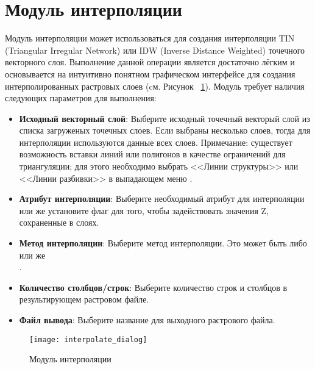 
\section{Модуль интерполяции}


Модуль интерполяции может использоваться для создания интерполяции TIN
(Triangular Irregular Network) или IDW (Inverse Distance Weighted)
точечного векторного слоя. Выполнение данной операции является
достаточно лёгким и основывается на интуитивно понятном графическом
интерфейсе для создания интерполированных растровых слоев (cм. Рисунок~
\ref{fig:interpolation_dialog}). Модуль требует наличия следующих
параметров для выполнения:

\begin{itemize}[label=--]
\item \textbf{Исходный векторный слой}: Выберите исходный точечный
векторый слой из списка загруженых точечных слоев. Если выбраны
несколько слоев, тогда для интерполяции используются данные всех слоев.
Примечание: существует возможность вставки линий или полигонов в
качестве ограничений для триангуляции; для этого необходимо выбрать
<<Линии структуры>> или <<Линии разбивки>> в выпадающем меню
.
\item \textbf{Атрибут интерполяции}: Выберите необходимый атрибут
для интерполяции или же установите флаг
 для того, чтобы
задействовать значения Z, сохраненные в слоях.
\item \textbf{Метод интерполяции}: Выберите метод интерполяции. Это
может быть либо \\
 или же \\
.
\item \textbf{Количество столбцов/строк}: Выберите количество строк и
столбцов в результирующем растровом файле.
\item \textbf{Файл вывода}: Выберите название для выходного растрового
файла.
\end{itemize}

\begin{figure}[ht]
   \centering
   \texttt{[image: interpolate\_dialog]}
   \caption{Модуль интерполяции \nixcaption}\label{fig:interpolation_dialog}
\end{figure}

